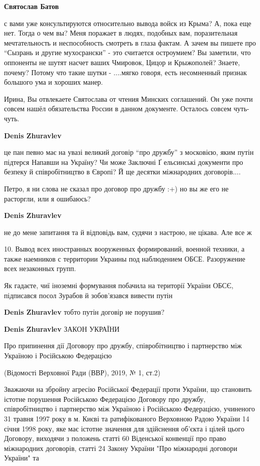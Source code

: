 \begin{itemize}
\begin{itemize}
\textbf{Святослав Батов} 

с вами уже консультируются относительно вывода войск из Крыма? А, пока еще нет.
Тогда о чем вы? Меня поражает в людях, подобных вам, поразительная
мечтательность и неспособность смотреть в глаза фактам. А зачем вы пишете про
\enquote{Сызрань и другие мухосрански} - это считается остроумием? Вы заметили, что
оппоненты не шутят насчет ваших Чмировок, Цицор и Крыжополей? Знаете, почему?
Потому что такие шутки - ....мягко говоря, есть несомненный признак большого
ума и хороших манер.


Ирина, Вы отвлекаете Святослава от чтения Минских соглашений. Он уже почти
совсем нашёл обязательства России в данном документе. Осталось совсем
чуть-чуть.

\textbf{Denis Zhuravlev} 

це пан певно має на увазі великий договір \enquote{про дружбу} з московією, яким путін
підтерся Напавши на Україну? Чи може Заключні Ґ ельсинські документи про
безпеку й співробітництво в Європі? Й ще десятки міжнародних договорів....

Петро, я ни слова не сказал про договор про дружбу :+) но вы же его не расторгли, или я ошибаюсь?

\textbf{Denis Zhuravlev} 

не до мене запитання та й відповідь вам, судячи з настрою, не цікава. Але все ж

10. Вывод всех иностранных вооруженных формирований, военной техники, а также
наемников с территории Украины под наблюдением ОБСЕ. Разоружение всех
незаконных групп.

Як гадаєте, чиї іноземні формування побачила на території України ОБСЄ,
підписався посол Зурабов й зобов'язався вивести путін


\textbf{Denis Zhuravlev} тобто путін договір не порушив?

\textbf{Denis Zhuravlev} ЗАКОН УКРАЇНИ

Про припинення дії Договору про дружбу, співробітництво і партнерство між Україною і Російською Федерацією

(Відомості Верховної Ради (ВВР), 2019, № 1, ст.2)

Зважаючи на збройну агресію Російської Федерації проти України, що становить
істотне порушення Російською Федерацією Договору про дружбу, співробітництво і
партнерство між Україною і Російською Федерацією, учиненого 31 травня 1997 року
в м. Києві та ратифікованого Верховною Радою України 14 січня 1998 року, яке
має істотне значення для здійснення об’єкта і цілей цього Договору, виходячи з
положень статті 60 Віденської конвенції про право міжнародних договорів, статті
24 Закону України "Про міжнародні договори України" та


\end{itemize}
\end{itemize}
